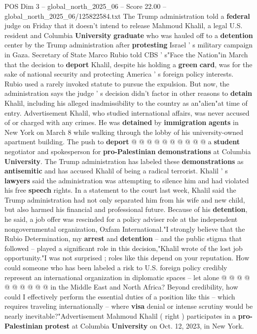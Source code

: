 \begin{textsample}{POS Dim 3 – global\_north\_2025\_06 – Score 22.00 – global\_north\_2025\_06/125822584.txt}  \label{ex:f3_pos_109}
The Trump administration told a \textbf{federal} judge on Friday that it doesn't intend to release Mahmoud Khalil, a legal U.S. resident and Columbia \textbf{University} \textbf{graduate} who was hauled off to a \textbf{detention} center by the Trump administration after \textbf{protesting} Israel ' s military campaign in Gaza.
Secretary of State Marco Rubio told CBS ' s"Face the Nation"in March that the decision to \textbf{deport} Khalil, despite his holding a \textbf{green} \textbf{card}, was for the sake of national security and protecting America ' s foreign policy interests.
Rubio used a rarely invoked statute to pursue the expulsion.
But now, the administration says the judge ' s decision didn't factor in other reasons to \textbf{detain} Khalil, including his alleged inadmissibility to the country as an"alien"at time of entry.
Advertisement Khalil, who studied international affairs, was never accused of or charged with any crimes.
He was \textbf{detained} by \textbf{immigration} \textbf{agents} in New York on March 8 while walking through the lobby of his university-owned apartment building.
The push to \textbf{deport} @ @ @ @ @ @ @ @ @ @ a \textbf{student} negotiator and spokesperson for \textbf{pro-Palestinian} \textbf{demonstrations} at Columbia \textbf{University}.
The Trump administration has labeled these \textbf{demonstrations} as \textbf{antisemitic} and has accused Khalil of being a radical terrorist.
Khalil ' s \textbf{lawyers} said the administration was attempting to silence him and had violated his free \textbf{speech} rights.
In a statement to the court last week, Khalil said the Trump administration had not only separated him from his wife and new child, but also harmed his financial and professional future.
Because of his \textbf{detention}, he said, a job offer was rescinded for a policy adviser role at the independent nongovernmental organization, Oxfam International."I strongly believe that the Rubio Determination, my \textbf{arrest} and \textbf{detention} -- and the public stigma that followed -- played a significant role in this decision,"Khalil wrote of the lost job opportunity."I was not surprised ; roles like this depend on your reputation.
How could someone who has been labeled a risk to U.S. foreign policy credibly represent an international organization in diplomatic spaces -- let alone @ @ @ @ @ @ @ @ @ @ in the Middle East and North Africa?
Beyond credibility, how could I effectively perform the essential duties of a position like this -- which requires traveling internationally -- where \textbf{visa} denial or intense scrutiny would be nearly inevitable?"Advertisement Mahmoud Khalil ( right ) participates in a \textbf{pro-Palestinian} \textbf{protest} at Columbia \textbf{University} on Oct. 12, 2023, in New York.

\end{textsample}
